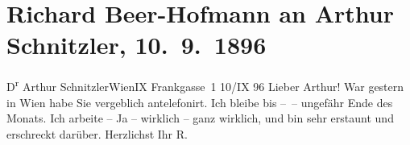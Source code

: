 

         \renewcommand{\erwaehnteOrte}{Orte: Baden bei Wien, Frankgasse 1, IX., Alsergrund, Wien}
         \renewcommand{\erwaehnteWerke}{}
               \section[Richard Beer-Hofmann an Arthur Schnitzler, 10. 9. 1896]{ Richard Beer-Hofmann an Arthur Schnitzler, 10. 9. 1896}\nopagebreak{}\rehead{ }\begin{ledgroupsized}[t]{13cm}\normalsize\beginnumbering \toendnotes[C]{\smallbreak\pagebreak[2]} 
\pstart{}{\pb}D\textsuperscript{r}
                  Arthur Schnitzler\pend{}\pstart{}Wien\pend{}\pstart{}IX Frankgasse 1\pend{}{\bigskip}\pstart
           \raggedleft{}{\pb}10/IX 96\pend
           \pstart
           Lieber Arthur! War gestern in Wien habe Sie vergeblich antelefonirt. Ich bleibe bis – – ungefähr Ende des
               Monats. Ich arbeite – Ja – wirklich – ganz wirklich, und bin sehr erstaunt und
               erschreckt darüber. Herzlichst Ihr \spacefill\mbox{R.}\pend
           
         
         \endnumbering{}\end{ledgroupsized}  \newcommand{\dateiname}{L00587}\newcommand{\titel}{Richard Beer-Hofmann an Arthur Schnitzler, 10. 9. 1896}\newcommand{\editorInnen}{Martin Anton Müller und Gerd-Hermann Susen}
      